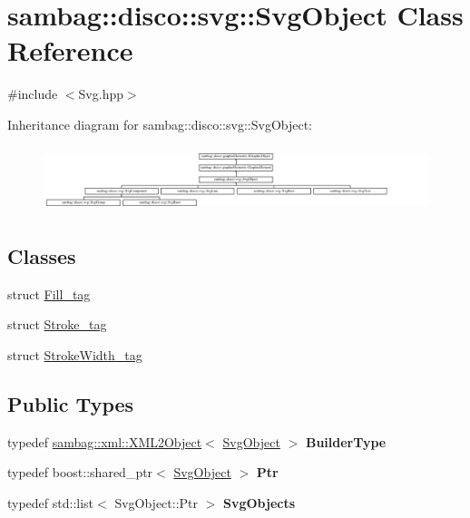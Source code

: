\hypertarget{classsambag_1_1disco_1_1svg_1_1_svg_object}{
\section{sambag::disco::svg::SvgObject Class Reference}
\label{classsambag_1_1disco_1_1svg_1_1_svg_object}
}


{\ttfamily \#include $<$Svg.hpp$>$}

Inheritance diagram for sambag::disco::svg::SvgObject:\begin{figure}[H]
\begin{center}
\leavevmode
\includegraphics[height=1.911263cm]{classsambag_1_1disco_1_1svg_1_1_svg_object}
\end{center}
\end{figure}
\subsection*{Classes}
\begin{DoxyCompactItemize}
\item 
struct \hyperlink{structsambag_1_1disco_1_1svg_1_1_svg_object_1_1_fill__tag}{Fill\_\-tag}
\item 
struct \hyperlink{structsambag_1_1disco_1_1svg_1_1_svg_object_1_1_stroke__tag}{Stroke\_\-tag}
\item 
struct \hyperlink{structsambag_1_1disco_1_1svg_1_1_svg_object_1_1_stroke_width__tag}{StrokeWidth\_\-tag}
\end{DoxyCompactItemize}
\subsection*{Public Types}
\begin{DoxyCompactItemize}
\item 
\hypertarget{classsambag_1_1disco_1_1svg_1_1_svg_object_a658b68f468a3d69bc714d67af800fdaf}{
typedef \hyperlink{classsambag_1_1xml_1_1_x_m_l2_object}{sambag::xml::XML2Object}$<$ \hyperlink{classsambag_1_1disco_1_1svg_1_1_svg_object}{SvgObject} $>$ {\bfseries BuilderType}}
\label{classsambag_1_1disco_1_1svg_1_1_svg_object_a658b68f468a3d69bc714d67af800fdaf}

\item 
\hypertarget{classsambag_1_1disco_1_1svg_1_1_svg_object_aff27d18dd0c94f46600edf6ace085ed9}{
typedef boost::shared\_\-ptr$<$ \hyperlink{classsambag_1_1disco_1_1svg_1_1_svg_object}{SvgObject} $>$ {\bfseries Ptr}}
\label{classsambag_1_1disco_1_1svg_1_1_svg_object_aff27d18dd0c94f46600edf6ace085ed9}

\item 
\hypertarget{classsambag_1_1disco_1_1svg_1_1_svg_object_a5f38522de0c74a49514e6fba84e9fcb1}{
typedef std::list$<$ SvgObject::Ptr $>$ {\bfseries SvgObjects}}
\label{classsambag_1_1disco_1_1svg_1_1_svg_object_a5f38522de0c74a49514e6fba84e9fcb1}

\end{DoxyCompactItemize}

